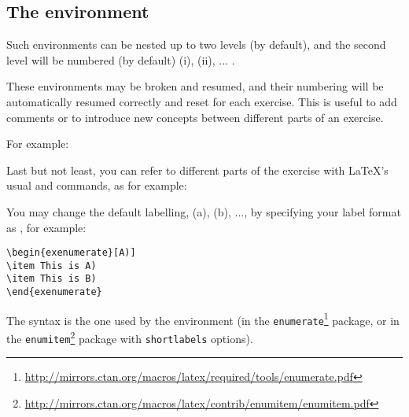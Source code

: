 \documentclass[11pt,a4paper]{article}
\begin{document}
\subsection{The  environment}


Such  environments can be nested up to two levels (by default), and
the second level will be numbered (by default) (i), (ii), ... .

These environments may be broken and resumed, and their numbering will be automatically
resumed correctly and reset for each exercise. This is useful to add comments or to
introduce new concepts between different parts of an exercise.

For example:
\begin{pkgverbatim}
%
\end{pkgverbatim}

Last but not least, you can refer to different parts of the exercise with \LaTeX's usual
 and 
commands, as for example:
\begin{pkgverbatim}
%
\end{pkgverbatim}

You may change the default labelling, (a), (b), ..., by specifying your label format as
, for example:
\begin{pkgverbatim}
\begin{verbatim}
\begin{exenumerate}[A)]
\item This is A)
\item This is B)
\end{exenumerate}
\end{verbatim}
\end{pkgverbatim}
The syntax is the one used by the  environment (in the
\texttt{enumerate}\footnote{\url{http://mirrors.ctan.org/macros/latex/required/tools/enumerate.pdf}}
package, or in the
\texttt{enumitem}\footnote{\url{http://mirrors.ctan.org/macros/latex/contrib/enumitem/enumitem.pdf}}
package with \texttt{shortlabels} options).
\end{document}
